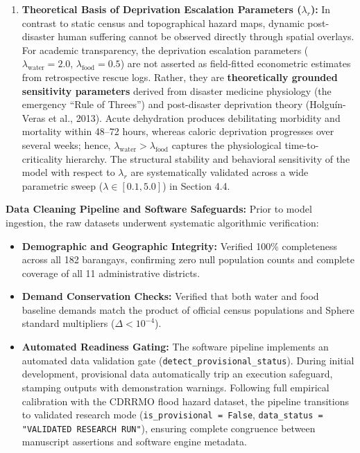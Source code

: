 \begin{enumerate}
    \item \textbf{Theoretical Basis of Deprivation Escalation Parameters ($\lambda_r$):} In contrast to static census and topographical hazard maps, dynamic post-disaster human suffering cannot be observed directly through spatial overlays. For academic transparency, the deprivation escalation parameters ($\lambda_{\text{water}} = 2.0$, $\lambda_{\text{food}} = 0.5$) are not asserted as field-fitted econometric estimates from retrospective rescue logs. Rather, they are \textbf{theoretically grounded sensitivity parameters} derived from disaster medicine physiology (the emergency ``Rule of Threes'') and post-disaster deprivation theory (Holgu\'{i}n-Veras et al., 2013). Acute dehydration produces debilitating morbidity and mortality within 48--72 hours, whereas caloric deprivation progresses over several weeks; hence, $\lambda_{\text{water}} > \lambda_{\text{food}}$ captures the physiological time-to-criticality hierarchy. The structural stability and behavioral sensitivity of the model with respect to $\lambda_r$ are systematically validated across a wide parametric sweep ($\lambda \in [0.1, 5.0]$) in Section 4.4.
\end{enumerate}

\textbf{Data Cleaning Pipeline and Software Safeguards:} Prior to model ingestion, the raw datasets underwent systematic algorithmic verification:
\begin{itemize}
    \item \textbf{Demographic and Geographic Integrity:} Verified 100\% completeness across all 182 barangays, confirming zero null population counts and complete coverage of all 11 administrative districts.
    \item \textbf{Demand Conservation Checks:} Verified that both water and food baseline demands match the product of official census populations and Sphere standard multipliers ($\Delta < 10^{-4}$).
    \item \textbf{Automated Readiness Gating:} The software pipeline implements an automated data validation gate (\texttt{detect\_provisional\_status}). During initial development, provisional data automatically trip an execution safeguard, stamping outputs with demonstration warnings. Following full empirical calibration with the CDRRMO flood hazard dataset, the pipeline transitions to validated research mode (\texttt{is\_provisional = False}, \texttt{data\_status = "VALIDATED RESEARCH RUN"}), ensuring complete congruence between manuscript assertions and software engine metadata.
\end{itemize}

